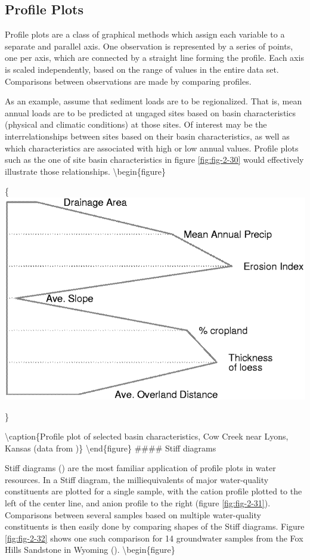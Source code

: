 \documentclass[]{book}
\begin{document}
\hypertarget{profile-plots}{%
\subsection{Profile Plots}\label{profile-plots}}

Profile plots are a class of graphical methods which assign each variable to a separate and parallel axis. One observation is represented by a series of points, one per axis, which are connected by a straight line forming the profile. Each axis is scaled independently, based on the range of values in the entire data set. Comparisons between observations are made by comparing profiles.

As an example, assume that sediment loads are to be regionalized. That is, mean annual loads are to be predicted at ungaged sites based on basin characteristics (physical and climatic conditions) at those sites. Of interest may be the interrelationships between sites based on their basin characteristics, as well as which characteristics are associated with high or low annual values. Profile plots such as the one of site basin characteristics in figure \ref{fig:fig-2-30} would effectively illustrate those relationships.
\textbackslash{}begin\{figure\}

\{\centering \includegraphics[width=13.24in]{figures/2_30}

\}

\textbackslash{}caption\{Profile plot of selected basin characteristics, Cow Creek near Lyons, Kansas (data from \citet{jordan_relation_1979})\}\label{fig:fig-2-30}
\textbackslash{}end\{figure\}
\#\#\#\# Stiff diagrams

Stiff diagrams (\citet{hem_study_1985}) are the most familiar application of profile plots in water resources. In a Stiff diagram, the milliequivalents of major water-quality constituents are plotted for a single sample, with the cation profile plotted to the left of the center line, and anion profile to the right (figure \ref{fig:fig-2-31}). Comparisons between several samples based on multiple water-quality constituents is then easily done by comparing shapes of the Stiff diagrams. Figure \ref{fig:fig-2-32} shows one such comparison for 14 groundwater samples from the Fox Hills Sandstone in Wyoming (\citet{henderson_geochemistry_1985}).
\textbackslash{}begin\{figure\}
\end{document}
